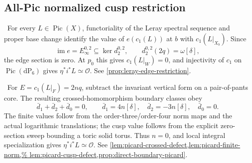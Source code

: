 \subsection{All-Pic normalized cusp restriction}

\begin{auditrecord}
\Verified\ For every $L\in\operatorname{Pic}(X)$, functoriality of the
Leray spectral sequence and proper base change identify the value of
$e(c_1(L))$ at $b$ with $c_1(L|_{X_b})$.  Since
\[
 \operatorname{im}e=E_\infty^{0,2}\subseteq\ker d_2^{0,2},
 \qquad d_2^{0,2}(2q)=\omega[\delta],
\]
the edge section is zero.  At $p_0$ this gives $c_1(L|_W)=0$, and
injectivity of $c_1$ on $\operatorname{Pic}(\mathrm{dP}_6)$ gives
$\eta^*i^*L\simeq\mathcal O$.  See
\cref{prop:leray-edge-restriction}.
\end{auditrecord}

\begin{auditrecord}
\Verified\ For $E=c_1(L|_F)=2nq$, subtract the invariant vertical form on a
pair-of-pants core.  The resulting crossed-homomorphism boundary classes obey
\[
 \bar d_1+\bar d_2+\bar d_0=0,\qquad
 \bar d_1=4n[\delta],\quad
 \bar d_2=-3n[\delta],\quad
 \bar d_0=0.
\]
The finite values follow from the order-three/order-four norm maps and the
actual logarithmic translations; the cusp value follows from the explicit
zero-section sweep bounding a toric solid torus.  Thus $n=0$, and local
integral specialization gives
$\eta^*i^*L\simeq\mathcal O$.  See
\cref{lem:picard-crossed-defect,lem:picard-finite-norm,%
lem:picard-cusp-defect,prop:direct-boundary-picard}.
\end{auditrecord}

